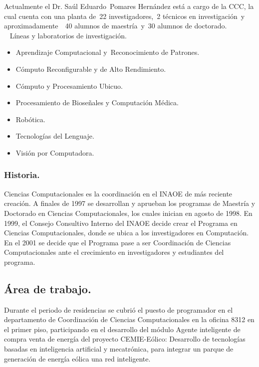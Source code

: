 Actualmente el Dr. Saúl Eduardo Pomares Hernández está a cargo de la CCC, la cual cuenta con una planta de 22 investigadores, 2 técnicos en investigación y aproximadamente  40 alumnos de maestría y 30 alumnos de doctorado.
\\
 
Líneas y laboratorios de investigación.
\begin{itemize}
   \item Aprendizaje Computacional y Reconocimiento de Patrones.
   \item Cómputo Reconfigurable y de Alto Rendimiento.
   \item Cómputo y Procesamiento Ubicuo.
   \item Procesamiento de Bioseñales y Computación Médica.
   \item Robótica.
   \item Tecnologías del Lenguaje.
   \item Visión por Computadora.
\end{itemize}

\subsubsection{Historia.}

Ciencias Computacionales es la coordinación en el INAOE de más reciente creación. A finales de 1997 se desarrollan y aprueban los programas de Maestría y Doctorado en Ciencias Computacionales, los cuales inician en agosto de 1998. En 1999, el Consejo Consultivo Interno del INAOE decide crear el Programa en Ciencias Computacionales, donde se ubica a los investigadores en Computación. En el 2001 se decide que el Programa pase a ser Coordinación de Ciencias Computacionales ante el crecimiento en investigadores y estudiantes del programa.

\subsection{Área de trabajo.}

Durante el periodo de residencias se cubrió el puesto de programador en el departamento de Coordinación de Ciencias Computacionales en la oficina 8312 en el primer piso, participando en el desarrollo del módulo Agente inteligente de compra venta de energía del proyecto CEMIE-Eólico: Desarrollo de tecnologías basadas en inteligencia artificial y mecatrónica, para integrar un parque de generación de energía eólica una red inteligente.
\\

